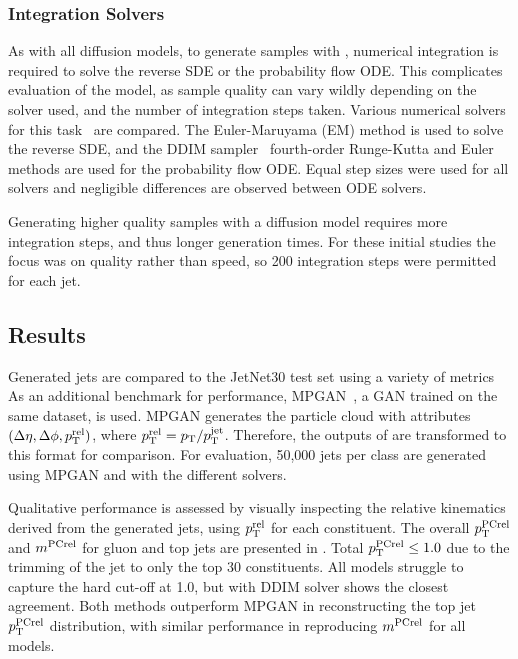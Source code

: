 \subsubsection{Integration Solvers}

As with all diffusion models, to generate samples with \pcjedi, numerical integration is required to solve the reverse SDE or the probability flow ODE.
This complicates evaluation of the model, as sample quality can vary wildly depending on the solver used, and the number of integration steps taken.
Various numerical solvers for this task~\cite{NumericalSolutionStochastic} are compared.
The Euler-Maruyama (EM) method is used to solve the reverse SDE, and the DDIM sampler~\cite{DDIM} fourth-order Runge-Kutta and Euler methods are used for the probability flow ODE.
Equal step sizes were used for all solvers and negligible differences are observed between ODE solvers.

Generating higher quality samples with a diffusion model requires more integration steps, and thus longer generation times.
For these initial studies the focus was on quality rather than speed, so 200 integration steps were permitted for each jet.

\subsection{Results}

Generated jets are compared to the JetNet30 test set using a variety of metrics
As an additional benchmark for performance, MPGAN~\cite{MPGAN}, a GAN trained on the same dataset, is used.
MPGAN generates the particle cloud with attributes $(\Delta\eta, \Delta\phi, p_\mathrm{T}^\text{rel})$, where $p_\mathrm{T}^\text{rel} = p_\mathrm{T} / p_\mathrm{T}^{\text{jet}}$.
Therefore, the outputs of \pcjedi are transformed to this format for comparison.
For evaluation, 50,000 jets per class are generated using MPGAN and \pcjedi with the different solvers.

Qualitative performance is assessed by visually inspecting the relative kinematics derived from the generated jets, using $p_\mathrm{T}^\text{rel}$ for each constituent.
The overall $p_\mathrm{T}^{\text{PCrel}}$ and $m^{\text{PCrel}}$ for gluon and top jets are presented in .
Total $p_\mathrm{T}^{\text{PCrel}}\leq1.0$ due to the trimming of the jet to only the top 30 constituents.
All models struggle to capture the hard cut-off at 1.0, but \pcjedi with DDIM solver shows the closest agreement.
Both \pcjedi methods outperform MPGAN in reconstructing the top jet $p_\mathrm{T}^{\text{PCrel}}$ distribution, with similar performance in reproducing $m^{\text{PCrel}}$ for all models.

